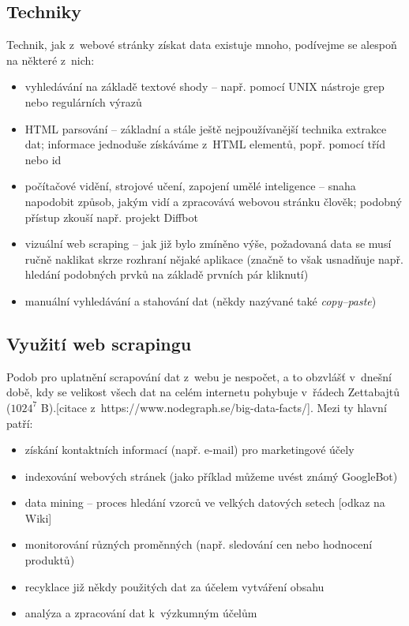 \documentclass[thesis=B,czech]{FITthesis}[2012/06/26]
\begin{document}
\subsection{Techniky}
Technik, jak z~webové stránky získat data existuje mnoho, podívejme se alespoň na některé z~nich:
\begin{itemize}
	\item vyhledávání na základě textové shody -- např. pomocí UNIX nástroje grep nebo regulárních výrazů
	\item HTML parsování -- základní a stále ještě nejpoužívanější technika extrakce dat; informace jednoduše získáváme z~HTML elementů, popř. pomocí tříd nebo id
	\item počítačové vidění, strojové učení, zapojení umělé inteligence -- snaha napodobit způsob, jakým vidí a zpracovává webovou stránku člověk; podobný přístup zkouší např. projekt Diffbot
	\item vizuální web scraping -- jak již bylo zmíněno výše, požadovaná data se musí ručně naklikat skrze rozhraní nějaké aplikace (značně to však usnadňuje např. hledání podobných prvků na základě prvních pár kliknutí)
	\item manuální vyhledávání a stahování dat (někdy nazývané také \textit{copy--paste})
\end{itemize}

\subsection{Využití web scrapingu}
Podob pro uplatnění scrapování dat z~webu je nespočet, a to obzvlášť v~dnešní době, kdy se velikost všech dat na celém internetu pohybuje v~řádech Zettabajtů ($1024^{7}$ B).[citace z~https://www.nodegraph.se/big-data-facts/]. Mezi ty hlavní patří:
\begin{itemize}
	\item získání kontaktních informací (např. e-mail) pro marketingové účely
	\item indexování webových stránek (jako příklad můžeme uvést známý GoogleBot)
	\item data mining -- proces hledání vzorců ve velkých datových setech [odkaz na Wiki]
	\item monitorování různých proměnných (např. sledování cen nebo hodnocení produktů)
	\item recyklace již někdy použitých dat za účelem vytváření  obsahu
	\item analýza a zpracování dat k~výzkumným účelům
\end{itemize}
\end{document}
